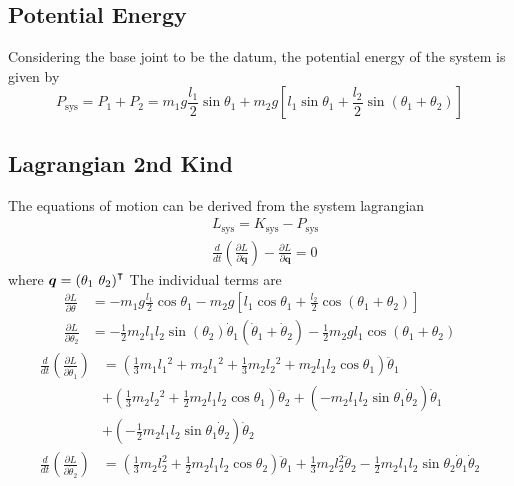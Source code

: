 \subsection{Potential Energy}
Considering the base joint to be the datum, the potential energy of the system is given by
\begin{equation*}
	P_{\text{sys}}=P_1+P_2=m_1 g \frac{l_1}{2} \sin \theta_1+m_2 g\left[l_1 \sin \theta_1+\frac{l_2}{2} \sin \left(\theta_1+\theta_2\right)\right]
\end{equation*}

\subsection{Lagrangian 2nd Kind}
The equations of motion can be derived from the system lagrangian
\begin{align*}
	&L_{\text{sys}} = K_{\text{sys}} - P_{\text{sys}}\\
	&\frac{d}{dt}\left(\frac{\partial L}{\partial \dot{\bm{q}}}\right) - \frac{\partial L}{\partial \bm{q}} = 0
\end{align*}
where $\bm{q} = \left(\theta_1 \text{ } \theta_2\right)^\intercal$
The individual terms are
\begin{align*}
	\frac{\partial L}{\partial \theta}&=-m_1 g \frac{l_1}{2} \cos \theta_1-m_2 g\left[l_1 \cos \theta_1+\frac{l_2}{2} \cos \left(\theta_1+\theta_2\right)\right] \\
	\frac{\partial L}{\partial \theta_2}&=-\frac{1}{2} m_2 l_1 l_2 \sin \left(\theta_2\right) \dot{\theta}_1\left(\dot{\theta}_1+\dot{\theta}_2\right)-\frac{1}{2} m_2 g l_1 \cos \left(\theta_1+\theta_2\right)
\end{align*}
\begin{align*}
	\frac{d}{dt}\left(\frac{\partial L}{\partial \dot{\theta}_1}\right)&=
	 \left(\frac{1}{3} m_1 l_1{ }^2+m_2 l_1{ }^2+\frac{1}{3} m_2 l_2{ }^2+m_2 l_1 l_2 \cos \theta_1\right) \ddot{\theta}_1 \\
		& +\left(\frac{1}{3} m_2 l_2{ }^2+\frac{1}{2} m_2 l_1 l_2 \cos \theta_1\right) \ddot{\theta}_2+\left(-m_2 l_1 l_2 \sin \theta_1 \dot{\theta}_2\right) \dot{\theta}_1 \\
		& +\left(-\frac{1}{2} m_2 l_1 l_2 \sin \theta_1 \dot{\theta}_2\right)\dot{\theta}_2
	\\
	\frac{d}{dt}\left(\frac{\partial L}{\partial \dot{\theta}_2}\right)&=\left(\frac{1}{3} m_2 l_2^2+\frac{1}{2} m_2 l_1 l_2 \cos \theta_2\right) \ddot{\theta}_1+\frac{1}{3} m_2 l_2^2 \ddot{\theta}_2-\frac{1}{2} m_2 l_1 l_2 \sin \theta_2 \dot{\theta}_1 \dot{\theta}_2
\end{align*}
